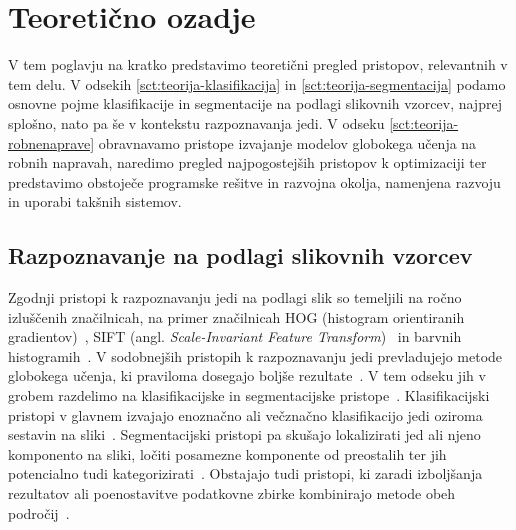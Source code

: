 \documentclass[a4paper,twoside,openright,12pt,slovene]{book}
\begin{document}
\chapter{Teoretično ozadje} \label{sct:teoreticno-ozadje}

    V tem poglavju na kratko predstavimo teoretični pregled pristopov, relevantnih v tem delu. V odsekih \ref{sct:teorija-klasifikacija} in \ref{sct:teorija-segmentacija} podamo osnovne pojme klasifikacije in segmentacije na podlagi slikovnih vzorcev, najprej splošno, nato pa še v kontekstu razpoznavanja jedi.
V odseku \ref{sct:teorija-robnenaprave} obravnavamo pristope izvajanje modelov globokega učenja na robnih napravah, naredimo pregled najpogostejših pristopov k optimizaciji ter predstavimo obstoječe programske rešitve in razvojna okolja, namenjena razvoju in uporabi takšnih sistemov.

    \section{Razpoznavanje na podlagi slikovnih vzorcev} 

            Zgodnji pristopi k razpoznavanju jedi na podlagi slik so temeljili
            na ročno izluščenih značilnicah, na primer značilnicah HOG
            (histogram orientiranih gradientov)~\cite{src:dalal2005hog}, SIFT
            (angl. \emph{Scale-Invariant Feature
            Transform})~\cite{src:lowe2004sift} in barvnih
            histogramih~\cite{src:min2019survey}.
            V sodobnejših pristopih k razpoznavanju jedi prevladujejo metode globokega učenja, ki praviloma dosegajo boljše rezultate~\cite{src:min2019survey, src:kagaya2014food, src:krizhevsky2012imagenet, src:hassannejad2016food, src:martinel2018wide}.
            V tem odseku jih v grobem razdelimo na klasifikacijske in segmentacijske pristope~\cite{src:konstantakopoulos2023review, src:min2019survey}. Klasifikacijski pristopi v glavnem izvajajo enoznačno ali večznačno klasifikacijo jedi oziroma sestavin na sliki~\cite{src:martinel2018wide, src:tan2019efficientnet, src:bolanos2017food, src:fu2024recognizing}. Segmentacijski pristopi pa skušajo lokalizirati jed ali njeno komponento na sliki, ločiti posamezne komponente od preostalih ter jih potencialno tudi kategorizirati~\cite{src:wu2021large, src:bolanos2016simultaneous, src:poply2021refined, src:konstantakopoulos2023review, src:javadi2024smart}. Obstajajo tudi pristopi, ki zaradi izboljšanja rezultatov ali poenostavitve podatkovne zbirke kombinirajo metode obeh področij~\cite{src:zhu2023new}.
\end{document}
